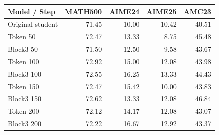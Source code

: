 \begin{tabular}{lrrrr}
\toprule
Model / Step & MATH500 & AIME24 & AIME25 & AMC23 \\
\midrule
Original student & 71.45 & 10.00 & 10.42 & 40.51 \\
Token 50 & 72.47 & 13.33 & 8.75 & 45.48 \\
Block3 50 & 71.50 & 12.50 & 9.58 & 43.67 \\
Token 100 & 72.92 & 15.00 & 12.08 & 43.98 \\
Block3 100 & 72.55 & 16.25 & 13.33 & 44.43 \\
Token 150 & 72.47 & 15.42 & 10.00 & 43.83 \\
Block3 150 & 72.62 & 13.33 & 12.08 & 46.84 \\
Token 200 & 72.12 & 14.17 & 12.08 & 43.07 \\
Block3 200 & 72.22 & 16.67 & 12.92 & 43.37 \\
\bottomrule
\end{tabular}

